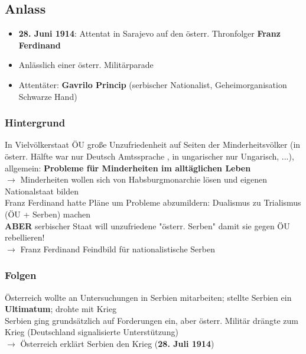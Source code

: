 \documentclass[a4paper, ngerman]{article}
\begin{document}
\subsection*{Anlass}
\begin{itemize}
    \item \textbf{28. Juni 1914}: Attentat in Sarajevo auf den österr. Thronfolger \textbf{Franz Ferdinand}
    \item Anlässlich einer österr. Militärparade
    \item Attentäter: \textbf{Gavrilo Princip} (serbischer Nationalist, Geheimorganisation Schwarze Hand)
\end{itemize}
\subsubsection*{Hintergrund}
In Vielvölkerstaat ÖU große Unzufriedenheit auf Seiten der Minderheitsvölker (in österr. Hälfte war nur Deutsch Amtssprache
, in ungarischer nur Ungarisch, ...), allgemein: \textbf{Probleme für Minderheiten im alltäglichen Leben} \\
$\rightarrow$ Minderheiten wollen sich von Habsburgmonarchie lösen und eigenen Nationalstaat bilden \\
Franz Ferdinand hatte Pläne um Probleme abzumildern: Dualismus zu Trialismus (ÖU + Serben) machen \\
\textbf{ABER} serbischer Staat will unzufriedene "österr. Serben" damit sie gegen ÖU rebellieren! \\
$\rightarrow$ Franz Ferdinand Feindbild für nationalistische Serben

\subsubsection*{Folgen}
Österreich wollte an Untersuchungen in Serbien mitarbeiten; stellte Serbien ein \textbf{Ultimatum}; drohte mit Krieg \\
Serbien ging grundsätzlich auf Forderungen ein, aber österr. Militär drängte zum Krieg (Deutschland signalisierte Unterstützung) \\
$\rightarrow$ Österreich erklärt Serbien den Krieg (\textbf{28. Juli 1914})
\end{document}
